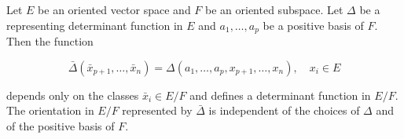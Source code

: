 Let $E$ be an oriented vector space and $F$ be an oriented subspace. Let $\Delta$ be a representing determinant function in $E$ and $a_1, \ldots, a_p$ be a positive basis of $F$. Then the function

$$\bar{\Delta}(\bar{x}_{p+1}, \ldots, \bar{x}_n) = \Delta(a_1, \ldots, a_p, x_{p+1}, \ldots, x_n), \quad x_i \in E$$

depends only on the classes $\bar{x}_i \in E/F$ and defines a determinant function in $E/F$. The orientation in $E/F$ represented by $\bar{\Delta}$ is independent of the choices of $\Delta$ and of the positive basis of $F$.
